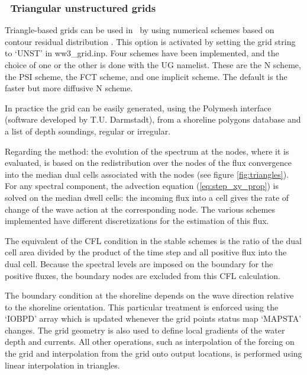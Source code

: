 \vssub
\subsubsection{~Triangular unstructured grids} \label{sub:num_space_tri}

\noindent Triangle-based grids can be used in \ws\ by using numerical schemes
based on contour residual distribution \citep[see][for a
review]{rep:Roland2008}.  This option is activated by setting the grid string
to `{\code UNST}' in {\file ww3\_grid.inp}.  Four schemes have been
implemented, and the choice of one or the other is done with the {\code UG}
namelist.  These are the N scheme, the PSI scheme, the FCT scheme, and one
implicit scheme. The default is the faster but more diffusive N scheme.

In practice the grid can be easily generated, using the Polymesh interface
(software developed by T.U. Darmstadt), from a shoreline polygons database
\citep[e.g.][]{art:WS96} and a list of depth soundings, regular or irregular.

Regarding the method: the evolution of the spectrum at the nodes, where it is
evaluated, is based on the redistribution over the nodes of the flux
convergence into the median dual cells associated with the nodes (see figure
\ref{fig:triangles}).  For any spectral component, the advection equation
(\ref{eq:step_xy_prop}) is solved on the median dwell cells: the incoming flux
into a cell gives the rate of change of the wave action at the corresponding
node. The various schemes implemented have different discretizations for the
estimation of this flux.

The equivalent of the CFL condition in the stable schemes is the ratio of the
dual cell area divided by the product of the time step and all positive flux
into the dual cell. Because the spectral levels are imposed on the boundary
for the positive fluxes, the boundary nodes are excluded from this CFL
calculation.

The boundary condition at the shoreline depends on the wave direction
relative to the shoreline orientation. This particular treatment is enforced
using the `{\code IOBPD}' array which is updated whenever the grid points
status map `{\code MAPSTA}' changes. The grid geometry is also used to define
local gradients of the water depth and currents. All other operations, such as
interpolation of the forcing on the grid and interpolation from the grid onto
output locations, is performed using linear interpolation in triangles.

